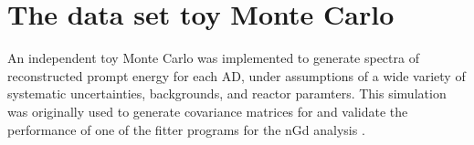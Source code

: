 

\section{The data set toy Monte Carlo}
\label{sec:lbnl_toymc}

An independent toy Monte Carlo was implemented
to generate spectra of reconstructed prompt energy for each AD,
under assumptions of a wide variety of systematic uncertainties,
backgrounds, and reactor paramters.
This simulation was originally \cite{lbnl_toymc,p12e_fitter,p14a_fitter} used to generate covariance matrices for
and validate the performance of
one of the fitter programs for the nGd analysis
\cite[Method A of][]{ngd2016}.
